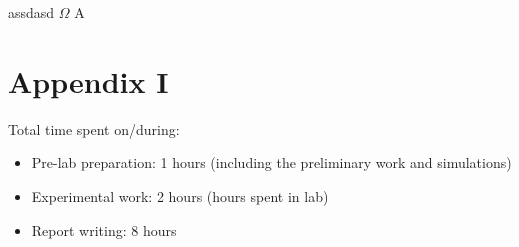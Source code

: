 \documentclass[letterpaper,12pt]{article}
\begin{document}
assdasd \( \Omega \) A


\section*{Appendix I}
Total time spent on/during:
\begin{itemize}
	\item Pre-lab preparation: 1 hours (including the preliminary work and simulations) 
	\item Experimental work: 2 hours (hours spent in lab)
	\item Report writing: 8 hours 
\end{itemize}



\end{document}
